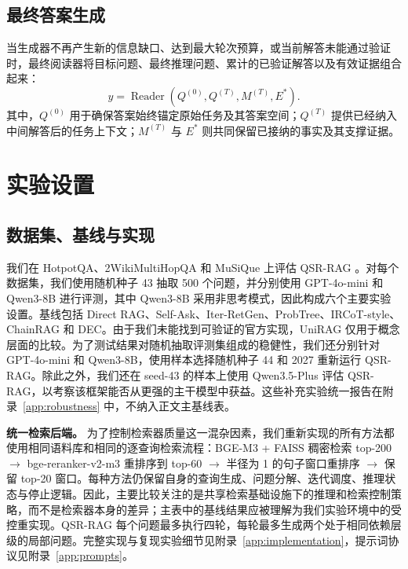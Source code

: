\documentclass[11pt]{article}
\begin{document}
	\subsection{最终答案生成}
	当生成器不再产生新的信息缺口、达到最大轮次预算，或当前解答未能通过验证时，最终阅读器将目标问题、最终推理问题、累计的已验证解答以及有效证据组合起来：
	\begin{equation}
		y=\operatorname{Reader}\!\left(Q^{(0)},Q^{(T)},M^{(T)},E^{*}\right).
		\label{eq:final-reader}
	\end{equation}
	其中，$Q^{(0)}$ 用于确保答案始终锚定原始任务及其答案空间；$Q^{(T)}$ 提供已经纳入中间解答后的任务上下文；$M^{(T)}$ 与 $E^{*}$ 则共同保留已接纳的事实及其支撑证据。

	\section{实验设置}

	\subsection{数据集、基线与实现}
	我们在 HotpotQA、2WikiMultiHopQA 和 MuSiQue 上评估 QSR-RAG \citep{yang2018hotpotqa,ho2020twowiki,trivedi2022musique}。对每个数据集，我们使用随机种子 43 抽取 500 个问题，并分别使用 GPT-4o-mini 和 Qwen3-8B 进行评测，其中 Qwen3-8B 采用非思考模式，因此构成六个主要实验设置。基线包括 Direct RAG、Self-Ask、Iter-RetGen、ProbTree、IRCoT-style、ChainRAG 和 DEC。由于我们未能找到可验证的官方实现，UniRAG 仅用于概念层面的比较。为了测试结果对随机抽取评测集组成的稳健性，我们还分别针对 GPT-4o-mini 和 Qwen3-8B，使用样本选择随机种子 44 和 2027 重新运行 QSR-RAG。除此之外，我们还在 seed-43 的样本上使用 Qwen3.5-Plus 评估 QSR-RAG，以考察该框架能否从更强的主干模型中获益。这些补充实验统一报告在附录~\ref{app:robustness} 中，不纳入正文主基线表。

	\textbf{统一检索后端。}
	为了控制检索器质量这一混杂因素，我们重新实现的所有方法都使用相同语料库和相同的逐查询检索流程：BGE-M3 + FAISS 稠密检索 top-200 $\rightarrow$ bge-reranker-v2-m3 重排序到 top-60 $\rightarrow$ 半径为 1 的句子窗口重排序 $\rightarrow$ 保留 top-20 窗口。每种方法仍保留自身的查询生成、问题分解、迭代调度、推理状态与停止逻辑。因此，主要比较关注的是共享检索基础设施下的推理和检索控制策略，而不是检索器本身的差异；主表中的基线结果应被理解为我们实验环境中的受控重实现。QSR-RAG 每个问题最多执行四轮，每轮最多生成两个处于相同依赖层级的局部问题。完整实现与复现实验细节见附录~\ref{app:implementation}，提示词协议见附录~\ref{app:prompts}。
\end{document}
